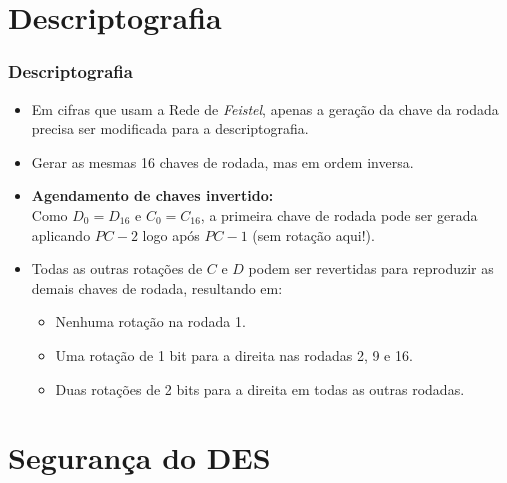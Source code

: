 \documentclass{beamer}
\begin{document}

\section{Descriptografia}
\begin{frame}
    \frametitle{Descriptografia}

    \begin{itemize}
        \item Em cifras que usam a Rede de \textit{Feistel}, apenas a geração da chave da rodada precisa ser modificada para a descriptografia.
        \item Gerar as mesmas 16 chaves de rodada, mas em ordem inversa.
    \end{itemize}
    \vspace{1em}
    \begin{itemize}
        \item \textbf{Agendamento de chaves invertido:} \\
        Como \( D_0 = D_{16} \) e \( C_0 = C_{16} \), a primeira chave de rodada pode ser gerada aplicando \( PC\!-\!2 \) logo após \( PC\!-\!1 \) (sem rotação aqui!).
        \item Todas as outras rotações de \( C \) e \( D \) podem ser revertidas para reproduzir as demais chaves de rodada, resultando em:
        \begin{itemize}
            \item Nenhuma rotação na rodada 1.
            \item Uma rotação de 1 bit para a direita nas rodadas 2, 9 e 16.
            \item Duas rotações de 2 bits para a direita em todas as outras rodadas.
        \end{itemize}
    \end{itemize}
\end{frame}


\section{Segurança do DES}
\end{document}
